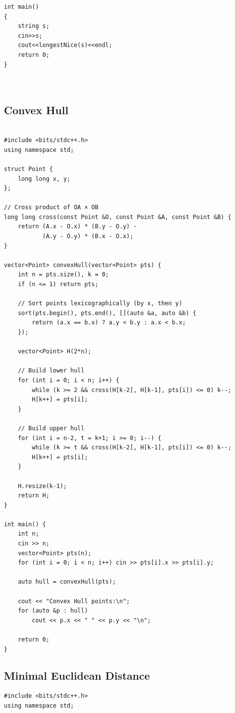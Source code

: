 \documentclass[a4paper,10pt,oneside]{article}
\begin{document}
\begin{multicols*}{\COLS}
\begin{lstlisting}
int main()
{
    string s;
    cin>>s;
    cout<<longestNice(s)<<endl;
    return 0;
}



\end{lstlisting}
\subsection{Convex Hull}
\begin{lstlisting}

#include <bits/stdc++.h>
using namespace std;

struct Point {
    long long x, y;
};

// Cross product of OA × OB
long long cross(const Point &O, const Point &A, const Point &B) {
    return (A.x - O.x) * (B.y - O.y) - 
           (A.y - O.y) * (B.x - O.x);
}

vector<Point> convexHull(vector<Point> pts) {
    int n = pts.size(), k = 0;
    if (n <= 1) return pts;

    // Sort points lexicographically (by x, then y)
    sort(pts.begin(), pts.end(), [](auto &a, auto &b) {
        return (a.x == b.x) ? a.y < b.y : a.x < b.x;
    });

    vector<Point> H(2*n);

    // Build lower hull
    for (int i = 0; i < n; i++) {
        while (k >= 2 && cross(H[k-2], H[k-1], pts[i]) <= 0) k--;
        H[k++] = pts[i];
    }

    // Build upper hull
    for (int i = n-2, t = k+1; i >= 0; i--) {
        while (k >= t && cross(H[k-2], H[k-1], pts[i]) <= 0) k--;
        H[k++] = pts[i];
    }

    H.resize(k-1);
    return H;
}

int main() {
    int n;
    cin >> n;
    vector<Point> pts(n);
    for (int i = 0; i < n; i++) cin >> pts[i].x >> pts[i].y;

    auto hull = convexHull(pts);

    cout << "Convex Hull points:\n";
    for (auto &p : hull)
        cout << p.x << " " << p.y << "\n";

    return 0;
}

\end{lstlisting}

\subsection{Minimal Euclidean Distance}
\begin{lstlisting}
#include <bits/stdc++.h>
using namespace std;


\end{lstlisting}
\end{multicols*}
\end{document}
